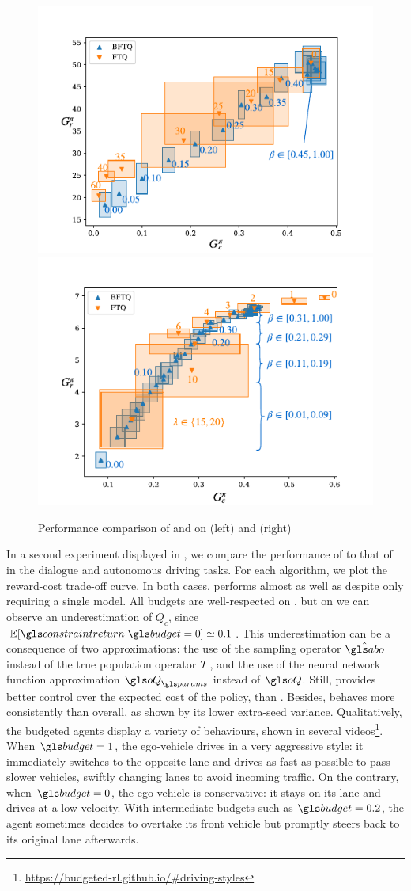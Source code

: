 \begin{figure}[th]
	\begin{center}
		\includegraphics[width=0.49\linewidth]{img/slot-filling}
		\includegraphics[width=0.49\linewidth]{img/highway}
		\caption{Performance comparison of \FTQl and \BFTQ on  (left) and (right) }
		\label{sec:brl-results}
	\end{center}
\end{figure}

In a second experiment displayed in , we compare the performance of \FTQl to that of \BFTQ in the dialogue and autonomous driving tasks. 
For each algorithm, we plot the reward-cost trade-off curve. In both cases, \BFTQ performs almost as well as \FTQl despite only requiring a single model. All budgets are well-respected on , but on  we can observe an underestimation of $Q_c$, since \eg $\expectedvalue[\constraintreturn|\budget=0] \simeq 0.1 $. This underestimation can be a consequence of two approximations: the use of the sampling operator $\hat{\abo}$ instead of the true population operator $\mathcal{T}$, and the use of the neural network function approximation $\oQ_\params$ instead of $\oQ$.
Still, \BFTQ provides better control over the expected cost of the policy, than \FTQl. Besides, \BFTQ behaves more consistently than \FTQl overall, as shown by its lower extra-seed variance.
Qualitatively, the budgeted agents display a variety of behaviours, shown in several videos\footnote{\href{https://budgeted-rl.github.io/\#driving-styles}{https://budgeted-rl.github.io/\#driving-styles}}. When $\budget = 1$, the ego-vehicle drives in a very aggressive style: it immediately switches to the opposite lane and drives as fast as possible to pass slower vehicles, swiftly changing lanes to avoid incoming traffic. On the contrary, when $\budget = 0$, the ego-vehicle is conservative: it stays on its lane and drives at a low velocity. With intermediate budgets such as $\budget = 0.2$, the agent sometimes decides to overtake its front vehicle but promptly steers back to its original lane afterwards.

